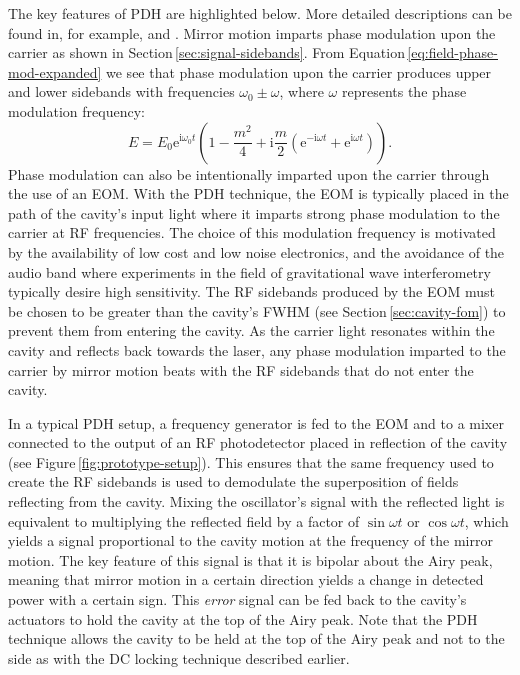 The key features of \gls{PDH} are highlighted below. More detailed descriptions can be found in, for example, \cite{Black2001} and \cite{Freise2010}. Mirror motion imparts phase modulation upon the carrier as shown in Section\,\ref{sec:signal-sidebands}. From Equation\,\ref{eq:field-phase-mod-expanded} we see that phase modulation upon the carrier produces upper and lower sidebands with frequencies $\omega_0 \pm \omega$, where $\omega$ represents the phase modulation frequency:
\begin{equation}
  \label{eq:field-phase-mod-expanded-30}
  E = E_0 \text{e}^{\text{i} \omega_0 t} \left( 1 - \frac{m^2}{4} + \text{i} \frac{m}{2} \left( \text{e}^{-\text{i} \omega t} + \text{e}^{\text{i} \omega t} \right) \right).
\end{equation}
Phase modulation can also be intentionally imparted upon the carrier through the use of an \gls{EOM}. With the \gls{PDH} technique, the \gls{EOM} is typically placed in the path of the cavity's input light where it imparts strong phase modulation to the carrier at \gls{RF} frequencies. The choice of this modulation frequency is motivated by the availability of low cost and low noise electronics, and the avoidance of the audio band where experiments in the field of gravitational wave interferometry typically desire high sensitivity. The \gls{RF} sidebands produced by the \gls{EOM} must be chosen to be greater than the cavity's \gls{FWHM} (see Section\,\ref{sec:cavity-fom}) to prevent them from entering the cavity. As the carrier light resonates within the cavity and reflects back towards the laser, any phase modulation imparted to the carrier by mirror motion beats with the \gls{RF} sidebands that do not enter the cavity.

In a typical \gls{PDH} setup, a frequency generator is fed to the \gls{EOM} and to a mixer connected to the output of an \gls{RF} photodetector placed in reflection of the cavity (see Figure\,\ref{fig:prototype-setup}). This ensures that the same frequency used to create the \gls{RF} sidebands is used to demodulate the superposition of fields reflecting from the cavity. Mixing the oscillator's signal with the reflected light is equivalent to multiplying the reflected field by a factor of $\sin{\omega t}$ or $\cos{\omega t}$, which yields a signal proportional to the cavity motion at the frequency of the mirror motion. The key feature of this signal is that it is bipolar about the Airy peak, meaning that mirror motion in a certain direction yields a change in detected power with a certain sign. This \emph{error} signal can be fed back to the cavity's actuators to hold the cavity at the top of the Airy peak. Note that the \gls{PDH} technique allows the cavity to be held at the top of the Airy peak and not to the side as with the DC locking technique described earlier.

